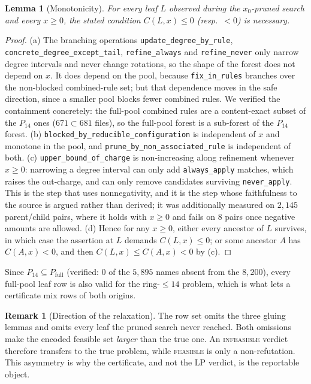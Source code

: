 \documentclass[11pt]{article}
\newtheorem{lemma}[theorem]{Lemma}
\theoremstyle{definition}
\newtheorem{remark}[theorem]{Remark}
\begin{document}
\begin{lemma}[Monotonicity]
\label{lem:mono}
For every leaf $L$ observed during the $x_0$-pruned search and every $x \ge 0$,
the stated condition $C(L,x) \le 0$ (resp.\ $< 0$) is necessary.
\end{lemma}

\begin{proof}
(a) The branching operations \texttt{update\_degree\_by\_rule},
\texttt{concrete\_degree\_except\_tail}, \texttt{refine\_always} and
\texttt{refine\_never} only narrow degree intervals and never change rotations,
so the shape of the forest does not depend on $x$. It does depend on the pool,
because \texttt{fix\_in\_rules} branches over the non-blocked combined-rule set;
but that dependence moves in the safe direction, since a smaller pool blocks
fewer combined rules. We verified the containment concretely: the full-pool
combined rules are a content-exact subset of the $P_{14}$ ones
($671 \subset 681$ files), so the full-pool forest is a sub-forest of the
$P_{14}$ forest.
(b) \texttt{blocked\_by\_reducible\_configuration} is independent of $x$ and
monotone in the pool, and \texttt{prune\_by\_non\_associated\_rule} is
independent of both.
(c) \texttt{upper\_bound\_of\_charge} is non-increasing along refinement whenever
$x \ge 0$: narrowing a degree interval can only add \texttt{always\_apply}
matches, which raises the out-charge, and can only remove candidates surviving
\texttt{never\_apply}. This is the step that uses nonnegativity, and it is the
step whose faithfulness to the source is argued rather than derived; it was
additionally measured on $2{,}145$ parent/child pairs, where it holds with
$x \ge 0$ and fails on $8$ pairs once negative amounts are allowed.
(d) Hence for any $x\ge0$, either every ancestor of $L$ survives, in which case
the assertion at $L$ demands $C(L,x) \le 0$; or some ancestor $A$ has
$C(A,x) < 0$, and then $C(L,x) \le C(A,x) < 0$ by (c).
\end{proof}

Since $P_{14} \subseteq P_{\mathrm{full}}$ (verified: $0$ of the $5{,}895$ names
absent from the $8{,}200$), every full-pool leaf row is also valid for the
ring-$\le14$ problem, which is what lets a certificate mix rows of both origins.

\begin{remark}[Direction of the relaxation]
\label{rem:direction}
The row set omits the three gluing lemmas and omits every leaf the pruned search
never reached. Both omissions make the encoded feasible set \emph{larger} than
the true one. An \textsc{infeasible} verdict therefore transfers to the true
problem, while \textsc{feasible} is only a non-refutation. This asymmetry is why
the certificate, and not the LP verdict, is the reportable object.
\end{remark}
\end{document}
